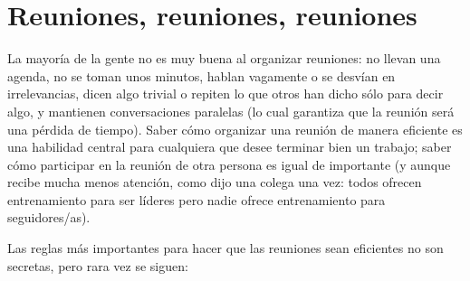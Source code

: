 \chapter{Reuniones, reuniones, reuniones}\label{s:meetings}

La mayoría de la gente no es muy buena al organizar reuniones:
no llevan una agenda,
no se toman unos minutos,
hablan vagamente o se desvían en irrelevancias,
dicen algo trivial o repiten lo que otros han dicho
sólo para decir algo,
y mantienen conversaciones paralelas 
(lo cual garantiza que la reunión será una pérdida de tiempo).
Saber cómo organizar una reunión de manera eficiente
es una habilidad central para cualquiera que desee terminar bien un trabajo;
saber cómo participar en la reunión de otra persona es igual de importante
(y aunque recibe mucha menos atención, como dijo una colega una vez:
todos ofrecen entrenamiento para ser líderes
pero nadie ofrece entrenamiento para seguidores/as).

Las reglas más importantes para hacer que las reuniones sean eficientes no son secretas,
pero rara vez se siguen:

